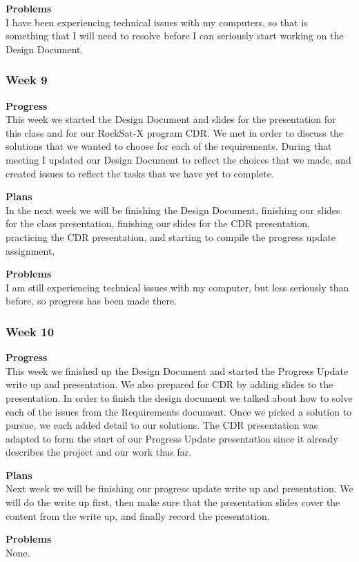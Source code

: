 \textbf{Problems} \\
I have been experiencing technical issues with my computers, so that is something that I will need to resolve before I can seriously start working on the Design Document.

\subsubsection{Week 9}
\textbf{Progress} \\ 
This week we started the Design Document and slides for the presentation for this class and for our RockSat-X program CDR. We met in order to discuss the solutions that we wanted to choose for each of the requirements. During that meeting I updated our Design Document to reflect the choices that we made, and created issues to reflect the tasks that we have yet to complete.

\textbf{Plans} \\ 
In the next week we will be finishing the Design Document, finishing our slides for the class presentation, finishing our slides for the CDR presentation, practicing the CDR presentation, and starting to compile the progress update assignment.

\textbf{Problems} \\ 
I am still experiencing technical issues with my computer, but less seriously than before, so progress has been made there.

\subsubsection{Week 10}
\textbf{Progress} \\ 
This week we finished up the Design Document and started the Progress Update write up and presentation. We also prepared for CDR by adding slides to the presentation. In order to finish the design document we talked about how to solve each of the issues from the Requirements document. Once we picked a solution to pursue, we each added detail to our solutions. The CDR presentation was adapted to form the start of our Progress Update presentation since it already describes the project and our work thus far.

\textbf{Plans} \\ 
Next week we will be finishing our progress update write up and presentation. We will do the write up first, then make sure that the presentation slides cover the content from the write up, and finally record the presentation.

\textbf{Problems} \\ 
None.

